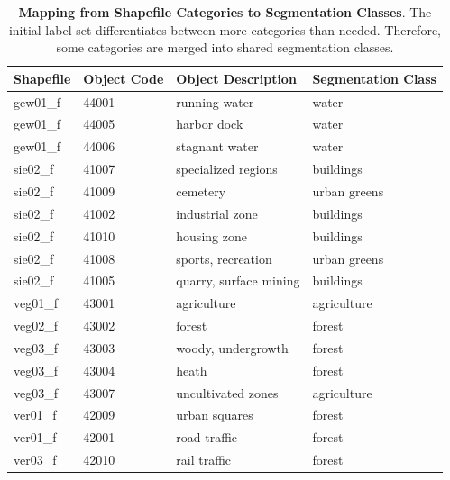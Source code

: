 \begin{table}[h]
\centering
\small
\caption[Mapping from Shapefile Categories to Segmentation Classes]
{\textbf{Mapping from Shapefile Categories to Segmentation Classes}. The initial label set differentiates between more categories than needed. Therefore, some categories are merged into shared segmentation classes.}
\label{tab:category_mapping}
\begin{tabular}{|l|l|l|l|}
\hline
\textbf{Shapefile} & \textbf{Object Code} & \textbf{Object Description}    & \textbf{Segmentation Class} \\ \hline
gew01\_f           & 44001                & running water                  & water                       \\ \hline
gew01\_f           & 44005                & harbor dock                    & water                       \\ \hline
gew01\_f           & 44006                & stagnant water                 & water                       \\ \hline
sie02\_f           & 41007                & specialized regions            & buildings                   \\ \hline
sie02\_f           & 41009                & cemetery                       & urban greens                \\ \hline
sie02\_f           & 41002                & industrial zone                & buildings                   \\ \hline
sie02\_f           & 41010                & housing zone                   & buildings                   \\ \hline
sie02\_f           & 41008                & sports, recreation             & urban greens                \\ \hline
sie02\_f           & 41005                & quarry, surface mining         & buildings                   \\ \hline
veg01\_f           & 43001                & agriculture                    & agriculture                 \\ \hline
veg02\_f           & 43002                & forest                         & forest                      \\ \hline
veg03\_f           & 43003                & woody, undergrowth             & forest                      \\ \hline
veg03\_f           & 43004                & heath                          & forest                      \\ \hline
veg03\_f           & 43007                & uncultivated zones             & agriculture                 \\ \hline
ver01\_f           & 42009                & urban squares                  & forest                      \\ \hline
ver01\_f           & 42001                & road traffic                   & forest                      \\ \hline
ver03\_f           & 42010                & rail traffic                   & forest                      \\ \hline
\end{tabular}
\end{table}

